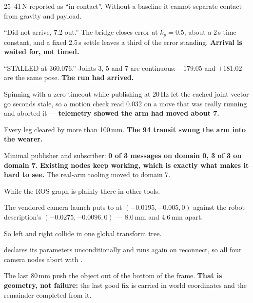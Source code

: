 {25--41\,N reported as ``in contact''. Without a baseline it cannot separate
contact from gravity and payload.}

{``Did not arrive, 7.2\dg{} out.'' The bridge closes error at $k_p = 0.5$, about
a 2\,s time constant, and a fixed 2.5\,s settle leaves a third of the error
standing. \textbf{Arrival is waited for, not timed.}}

{``STALLED at 360.076\dg.'' Joints 3, 5 and 7 are continuous: $-179.05$\dg{} and
$+181.02$\dg{} are the same pose. \textbf{The run had arrived.}}

{Spinning with a zero timeout while publishing at 20\,Hz let the cached joint
vector go seconds stale, so a motion check read 0.032\dg{} on a move that was
really running and aborted it --- \textbf{telemetry showed the arm had moved
about 7\dg.}}

{Every leg cleared by more than 100\,mm. \textbf{The 94\dg{} transit swung the
arm into the wearer.}}

{Minimal publisher and subscriber: \textbf{0 of 3 messages on domain 0, 3 of 3 on
domain 7.} \textbf{Existing nodes keep working, which is exactly what makes it
hard to see.} The real-arm tooling moved to domain 7.}

{While the ROS graph is plainly there in other tools.}

{The vendored camera launch puts  to  at
$(-0.0195, -0.005, 0)$ against the robot description's
$(-0.0275, -0.0096, 0)$ --- 8.0\,mm and 4.6\,mm apart.}

{So left and right collide in one global transform tree.}

{ declares its parameters unconditionally and runs again
on reconnect, so all four camera nodes abort with
.}

{The last 80\,mm push the object out of the bottom of the frame.
\textbf{That is geometry, not failure:} the last good fix is carried in world
coordinates and the remainder completed from it.}

